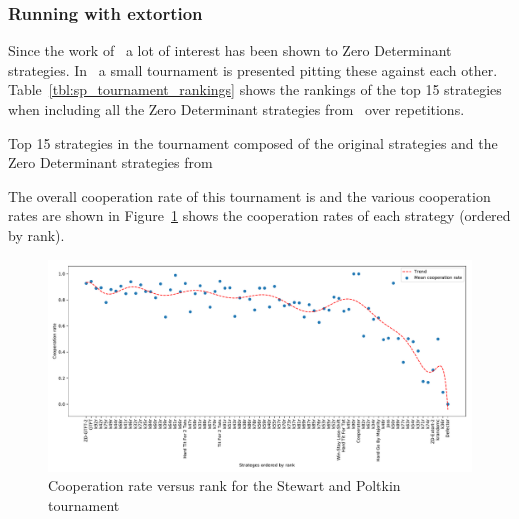 \documentclass{article}
\begin{document}

\subsubsection{Running with extortion}\label{sec:run_with_stewart_plotkin}

Since the work of~\cite{Press2012} a lot of interest has been shown to Zero
Determinant strategies. In~\cite{Stewart2012} a small tournament is presented
pitting these against each other. Table~\ref{tbl:sp_tournament_rankings}
shows the rankings of the top 15 strategies when including all the Zero
Determinant strategies from~\cite{Stewart2012} over
repetitions.

\begin{table}[!hbtp]
        \centering
        
        \caption{Top 15 strategies in the tournament composed of the original
                 strategies and the Zero Determinant strategies
                 from~\cite{Stewart2012}}
        \label{tbl:sp_tournament_rankings}
\end{table}

The overall cooperation rate of this tournament is
and the various
cooperation rates are shown in
Figure~\ref{fig:sp_tournament_cooperation_rate_versus_rank} shows the
cooperation rates of each strategy (ordered by rank).

\begin{figure}[!hbtp]
    \centering
    \includegraphics[width=.8\textwidth]{assets/sp_tournament_cooperation_rate_versus_rank.pdf}
    \caption{Cooperation rate versus rank for the Stewart and Poltkin tournament}
    \label{fig:sp_tournament_cooperation_rate_versus_rank}
\end{figure}
\end{document}
